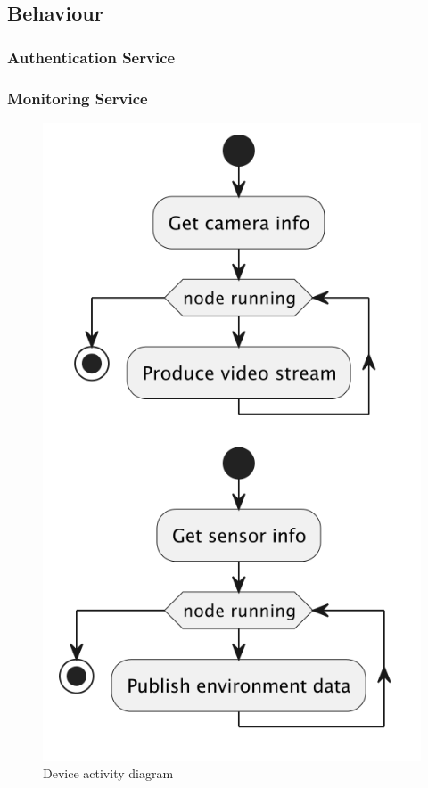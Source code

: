 \documentclass{scrartcl}
\begin{document}
    \subsection{Behaviour}

    \subsubsection{Authentication Service}

    \subsubsection{Monitoring Service}
    \begin{figure}
        \centering
        \includegraphics[scale=0.4]{img/device-activity}
        \caption{Device activity diagram}
        \label{fig:device-activity}
    \end{figure}
\end{document}
